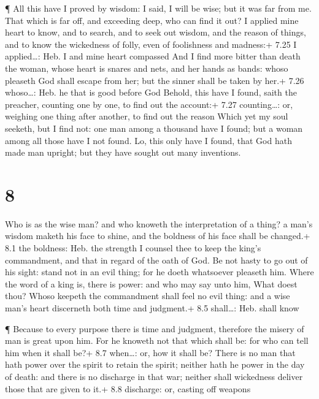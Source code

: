  ¶ All this have I proved by wisdom: I said, I will be
wise; but it was far from me.  That which is far off, and
exceeding deep, who can find it out?  I applied mine heart
to know, and to search, and to seek out wisdom, and the reason of
things, and to know the wickedness of folly, even of foolishness and
madness:+ 7.25 I applied\ldots: Heb. I and mine heart compassed
 And I find more bitter than death the woman, whose heart
is snares and nets, and her hands as bands: whoso pleaseth God shall
escape from her; but the sinner shall be taken by her.+ 7.26
whoso\ldots: Heb. he that is good before God  Behold, this
have I found, saith the preacher, counting one by one, to find out the
account:+ 7.27 counting\ldots: or, weighing one thing after another, to
find out the reason  Which yet my soul seeketh, but I find
not: one man among a thousand have I found; but a woman among all those
have I not found.  Lo, this only have I found, that God
hath made man upright; but they have sought out many inventions.

\hypertarget{section-7}{%
\section{8}\label{section-7}}

 Who is as the wise man? and who knoweth the interpretation
of a thing? a man's wisdom maketh his face to shine, and the boldness of
his face shall be changed.+ 8.1 the boldness: Heb. the strength
 I counsel thee to keep the king's commandment, and that in
regard of the oath of God.  Be not hasty to go out of his
sight: stand not in an evil thing; for he doeth whatsoever pleaseth him.
 Where the word of a king is, there is power: and who may
say unto him, What doest thou?  Whoso keepeth the
commandment shall feel no evil thing: and a wise man's heart discerneth
both time and judgment.+ 8.5 shall\ldots: Heb. shall know

 ¶ Because to every purpose there is time and judgment,
therefore the misery of man is great upon him.  For he
knoweth not that which shall be: for who can tell him when it shall be?+
8.7 when\ldots: or, how it shall be?  There is no man that
hath power over the spirit to retain the spirit; neither hath he power
in the day of death: and there is no discharge in that war; neither
shall wickedness deliver those that are given to it.+ 8.8 discharge: or,
casting off weapons

